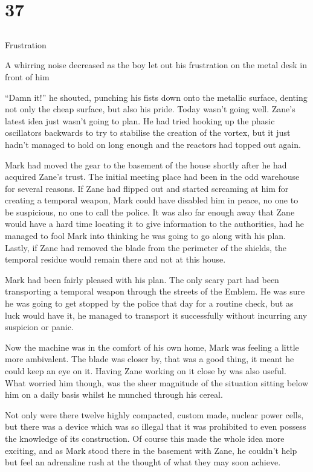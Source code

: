 \chapter{37}
\section{}
Frustration  

A whirring noise decreased as the boy let out his frustration on the metal desk in front of him

``Damn it!'' he shouted, punching his fists down onto the metallic surface, denting not only the cheap surface, but also his pride.  Today wasn't going well.  Zane's latest idea just wasn't going to plan.  He had tried hooking up the phasic oscillators backwards to try to stabilise the creation of the vortex, but it just hadn't managed to hold on long enough and the reactors had topped out again.

Mark had moved the gear to the basement of the house shortly after he had acquired Zane's trust.  The initial meeting place had been in the odd warehouse for several reasons.  If Zane had flipped out and started screaming at him for creating a temporal weapon, Mark could have disabled him in peace, no one to be suspicious, no one to call the police.  It was also far enough away that Zane would have a hard time locating it to give information to the authorities, had he managed to fool Mark into thinking he was going to go along with his plan.  Lastly, if Zane had removed the blade from the perimeter of the shields, the temporal residue would remain there and not at this house.

Mark had been fairly pleased with his plan.  The only scary part had been transporting a temporal weapon through the streets of the Emblem.  He was sure he was going to get stopped by the police that day for a routine check, but as luck would have it, he managed to transport it successfully without incurring any suspicion or panic.

Now the machine was in the comfort of his own home, Mark was feeling a little more ambivalent.  The blade was closer by, that was a good thing, it meant he could keep an eye on it.  Having Zane working on it close by was also useful.  What worried him though, was the sheer magnitude of the situation sitting below him on a daily basis whilst he munched through his cereal.

Not only were there twelve highly compacted, custom made, nuclear power cells, but there was a device which was so illegal that it was prohibited to even possess the knowledge of its construction.  Of course this made the whole idea more exciting, and as Mark stood there in the basement with Zane, he couldn't help but feel an adrenaline rush at the thought of what they may soon achieve.

